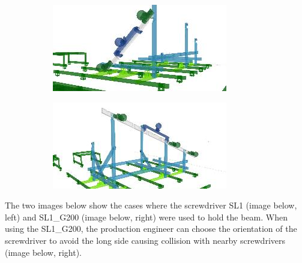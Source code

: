 \documentclass[11pt]{book}
\begin{document}
\begin{figure}[H]
\centering
\begin{subfigure}[b]{0.45\textwidth}
\centering
\includegraphics[width=\textwidth]{./images/image6.jpeg}
\end{subfigure}
\hfill
\begin{subfigure}[b]{0.45\textwidth}
\centering
\includegraphics[width=\textwidth]{./images/image7.jpeg}
\end{subfigure}
\end{figure}


The two images below show the cases where the screwdriver SL1 (image below, left) and SL1\_G200 (image below, right) were used to hold the beam. When using the SL1\_G200, the production engineer can choose the orientation of the screwdriver to avoid the long side causing collision with nearby screwdrivers (image below, right). 
\end{document}
